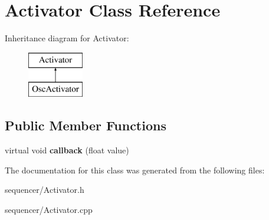 \hypertarget{classActivator}{}\section{Activator Class Reference}
\label{classActivator}
Inheritance diagram for Activator\+:\begin{figure}[H]
\begin{center}
\leavevmode
\includegraphics[height=2.000000cm]{classActivator}
\end{center}
\end{figure}
\subsection*{Public Member Functions}
\begin{DoxyCompactItemize}
\item 
virtual void {\bfseries callback} (float value)\hypertarget{classActivator_ace74b175ffcc2ad9cc03f15a0e713743}{}\label{classActivator_ace74b175ffcc2ad9cc03f15a0e713743}

\end{DoxyCompactItemize}


The documentation for this class was generated from the following files\+:\begin{DoxyCompactItemize}
\item 
sequencer/Activator.\+h\item 
sequencer/Activator.\+cpp\end{DoxyCompactItemize}
